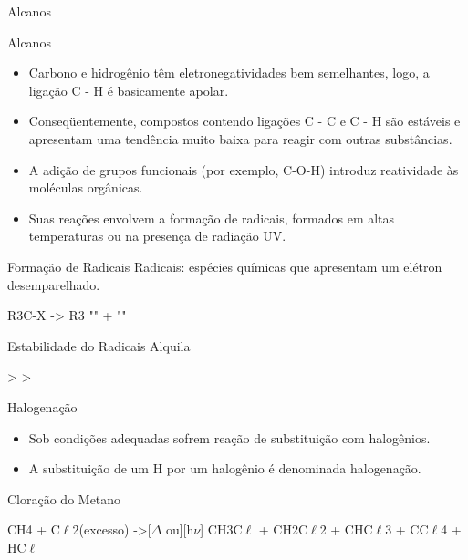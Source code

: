 \documentclass{beamer}
\begin{document}
\begin{frame}[label={sec:orgefcf320}]{Alcanos}
\begin{block}{Alcanos}
\begin{itemize}
\item Carbono e hidrogênio têm eletronegatividades bem semelhantes, logo, a ligação C - H é basicamente apolar.
\item Conseqüentemente, compostos contendo ligações C - C e C - H são estáveis e apresentam uma tendência muito baixa para reagir com outras substâncias.
\item A adição de grupos funcionais (por exemplo, C-O-H) introduz reatividade às moléculas orgânicas.
\item Suas reações envolvem a formação de radicais, formados em altas temperaturas ou na presença de radiação UV.
\end{itemize}
\end{block}

\begin{block}{Formação de Radicais}
\alert{Radicais:} espécies químicas que apresentam um elétron desemparelhado.

\begin{reaction}
	R3C-X -> R3 ""  +  ""
\end{reaction}


\begin{bclogo}[couleur=blue!30 , arrondi=0.1 , logo=\bcplume , epBarre=3.5]{Estabilidade do Radicais Alquila}
\begin{center}	
 \qquad > \qquad {} \qquad > \qquad {}
\end{center}
\end{bclogo}
\end{block}

\begin{block}{Halogenação}
\begin{itemize}
\item Sob condições adequadas sofrem reação de substituição com halogênios.
\item A substituição de um \alert{H} por um halogênio é denominada \alert{halogenação}.
\end{itemize}



\begin{bclogo}[couleur=blue!30 , arrondi=0.1 , logo=\bcplume , epBarre=3.5]{Cloração do Metano}
\begin{reaction*}
CH4 + C$\ell$2(excesso) ->[$\Delta$ ou][h$\nu$] CH3C$\ell$ + CH2C$\ell$2 + CHC$\ell$3 + CC$\ell$4 + HC$\ell$
\end{reaction*}	 
\end{bclogo}
\end{block}



\end{frame}
\end{document}
